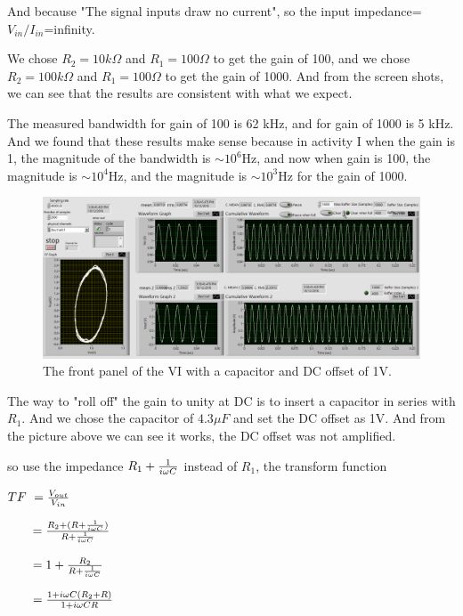 \documentclass[11pt]{article}
\begin{document}
And because "The signal inputs draw no current", so the input impedance=$V_{in}/I_{in}$=infinity.

We chose $R_{2}=10k \Omega$ and $R_{1}=100 \Omega$ to get the gain of 100, and we chose $R_{2}=100k \Omega$ and $R_{1}=100 \Omega$ to get the gain of 1000. And from the screen shots, we can see that the results are consistent with what we expect.

The measured bandwidth for gain of 100 is 62 kHz, and for gain of 1000 is 5 kHz. And we found that these results make sense because in activity I when the gain is 1, the magnitude of the bandwidth is $\sim10^6$Hz, and now when gain is 100, the magnitude is $\sim10^4$Hz, and the magnitude is $\sim10^3$Hz for the gain of 1000.

\vbox{}

\begin{figure}[H]
 \begin{center}
  \includegraphics[width=\linewidth/1]{act3_4}
  \caption{The front panel of the VI with a capacitor and DC offset of 1V.}
  \label{fig:act3_4}
 \end{center}
\end{figure}

The way to "roll off" the gain to unity at DC is to insert a capacitor in series with $R_{1}$. And we chose the capacitor of $4.3 \mu F$ and set the DC offset as 1V. And from the picture above we can see it works, the DC offset was not amplified.

so use the impedance $R_{1}+{1 \over{i\omega C}}$ instead of $R_{1}$, the transform function

$TF\ ={V_{out}\over{V_{in}}}$

$\qquad = {{{R_{2}+(R+{1 \over{i\omega C}})}}\over{{R+{1\over{i\omega C}}}}}$

$\qquad = 1+ {{{R_{2}}}\over{{R+{1\over{i\omega C}}}}}$

$\qquad = {{{1+i\omega C(R_{2}+R)}}\over{{1+{i\omega CR}}}}$
\end{document}
